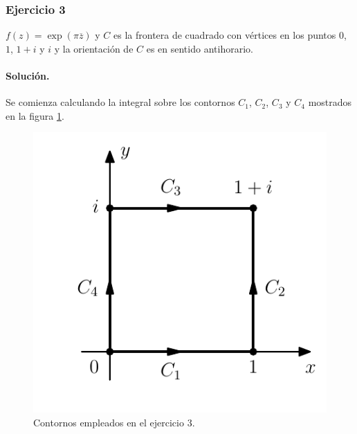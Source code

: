 \documentclass[a4paper]{report}
\begin{document}
\subsubsection{Ejercicio 3}

\(f(z)=\exp(\pi\overline{z})\) y \(C\) es la frontera de cuadrado con vértices en los puntos \(0\), \(1\), \(1+i\) y \(i\) y la orientación de \(C\) es en sentido antihorario.

\paragraph{Solución.} Se comienza calculando la integral sobre los contornos \(C_1\), \(C_2\), \(C_3\) y \(C_4\) mostrados en la figura \ref{fig:exercise_46_03}.
 \begin{figure}[!htb]
  \begin{minipage}[c]{0.32\textwidth}
    \includegraphics[width=\textwidth]{figuras/exercise_46_03.pdf}
  \end{minipage}\hfill
  \begin{minipage}[c]{0.58\textwidth}
    \caption{
       Contornos empleados en el ejercicio 3.
    }\label{fig:exercise_46_03}
  \end{minipage}
 \end{figure}
\end{document}
